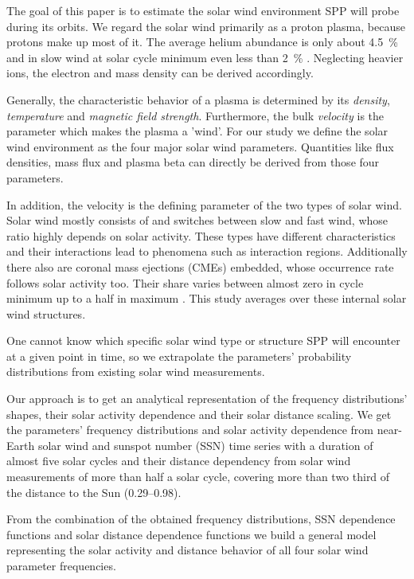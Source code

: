 The goal of this paper is to estimate the solar wind environment SPP will probe during its orbits. We regard the solar wind primarily as a proton plasma, because protons make up most of it. The average helium abundance is only about \SI{4.5}{\percent} and in slow wind at solar cycle minimum even less than \SI{2}{\percent} \citep{Feldman1978,Schwenn1983,Kasper2012}. Neglecting heavier ions, the electron and mass density can be derived accordingly.

Generally, the characteristic behavior of a plasma is determined by its \textit{density}, \textit{temperature} and \textit{magnetic field strength}. Furthermore, the bulk \textit{velocity} is the parameter which makes the plasma a 'wind'. For our study we define the solar wind environment as the four major solar wind parameters. Quantities like flux densities, mass flux and plasma beta can directly be derived from those four parameters.

In addition, the velocity is the defining parameter of the two types of solar wind. Solar wind mostly consists of and switches between slow and fast wind, whose ratio highly depends on solar activity. These types have different characteristics and their interactions lead to phenomena such as interaction regions. Additionally there also are coronal mass ejections (CMEs) embedded, whose occurrence rate follows solar activity too. Their share varies between almost zero in cycle minimum up to a half in maximum \citep{Richardson2012}. This study averages over these internal solar wind structures.

One cannot know which specific solar wind type or structure SPP will encounter at a given point in time, so we extrapolate the parameters' probability distributions from existing solar wind measurements.

Our approach is to get an analytical representation of the frequency distributions' shapes, their solar activity dependence and their solar distance scaling. We get the parameters' frequency distributions and solar activity dependence from near-Earth solar wind and sunspot number (SSN) time series with a duration of almost five solar cycles and their distance dependency from solar wind measurements of more than half a solar cycle, covering more than two third of the distance to the Sun (\SIrange{0.29}{0.98}{\au}).%

From the combination of the obtained frequency distributions, SSN dependence functions and solar distance dependence functions we build a general model representing the solar activity and distance behavior of all four solar wind parameter frequencies.

